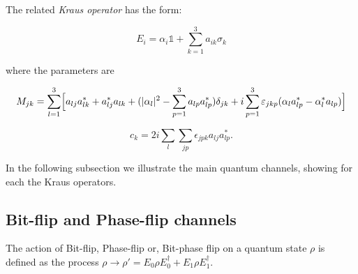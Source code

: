 The related \textit{Kraus operator} has the form:

\begin{equation}
E_i = \alpha_i \mathbb{1} + \sum_{k=1}^3 a_{ik} \sigma_k
\label{20_firstchapter}
\end{equation}

\noindent where the parameters are

\begin{equation}
M_{jk}=\sum_{l=1}^3 \Bigl[ a_{lj} a_{lk}^* + a_{lj}^* a_{lk} + ( |\alpha_l |^2 - \sum_{p=1}^3 a_{lp} a_{lp}^* ) \delta_{jk} + i \sum_{p=1}^3 \epsilon_{jkp} (\alpha_l a_{lp}^* - \alpha_l^* a_{lp}) \Bigr]
\label{21_firstchapter}
\end{equation}

\begin{equation}
c_k=2i \sum_l \sum_{jp} \epsilon_{jpk} a_{lj} a_{lp}^*.
\label{22_firstchapter}
\end{equation}

\noindent
In the following subsection we illustrate the main quantum channels, showing for each the Kraus operators.

\subsection{Bit-flip and Phase-flip channels}

The action of Bit-flip, Phase-flip or, Bit-phase flip on a quantum state $\rho$ is defined as the process $\rho \rightarrow \rho' = E_0 \rho E_0^\dagger + E_1 \rho E_1^\dagger $.

